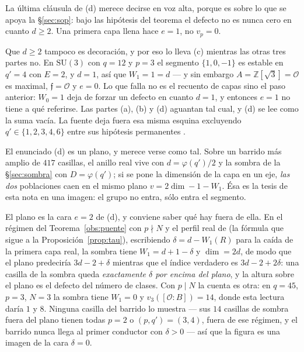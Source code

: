 \documentclass[11pt,a4paper]{article}
\theoremstyle{definition}
\newcommand{\SU}{\mathrm{SU}}
\newcommand{\ZZ}{\mathbb{Z}}
\newcommand{\cO}{\mathcal{O}}
\begin{document}
La \'ultima cl\'ausula de (d) merece decirse en voz alta, porque es sobre lo que se apoya la
\S\ref{sec:sop}: bajo las hip\'otesis del teorema el defecto no es nunca cero en cuanto $d\ge2$. Una
primera capa llena hace $e=1$, no $v_p=0$.

Que $d\ge2$ tampoco es decoraci\'on, y por eso lo lleva (c) mientras las otras tres partes no. En
$\SU(3)$ con $q=12$ y $p=3$ el segmento $\{1,0,-1\}$ es estable en $q'=4$ con $E=2$, y $d=1$, as\'i
que $W_1=1=d$ --- y sin embargo $A=\ZZ[\sqrt3]=\cO$ es maximal, $\mathfrak f=\cO$ y $e=0$. Lo que
falla no es el recuento de capas sino el paso anterior: $W_0=1$ deja de forzar un defecto en cuanto
$d=1$, y entonces $e=1$ no tiene a qu\'e referirse. Las partes (a), (b) y (d) aguantan tal cual, y
(d) se lee como la suma vac\'ia. La fuente deja fuera esa misma esquina excluyendo
$q'\in\{1,2,3,4,6\}$ entre sus hip\'otesis permanentes \cite[\S5]{Cond}.

El enunciado (d) es un plano, y merece verse como tal. Sobre un barrido m\'as amplio de $417$
casillas, el anillo real vive con $d=\varphi(q')/2$ y la sombra de la \S\ref{sec:sombra} con
$D=\varphi(q')$; si se pone la dimensi\'on de la capa en un eje, \emph{las dos} poblaciones caen en
el mismo plano $v=2\dim-1-W_1$. \'Esa es la tesis de esta nota en una imagen: el grupo no entra,
s\'olo entra el segmento.

El plano es la cara $e=2$ de (d), y conviene saber qu\'e hay fuera de ella. En el r\'egimen del
Teorema~\ref{obs:puente} con $p\nmid N$ y el perfil real de \cite{Cond} (la f\'ormula que sigue a la
Proposici\'on~\ref{prop:tau}), escribiendo $\delta=d-W_1(R)$ para la ca\'ida de la primera capa real,
la sombra tiene $W_1=d+1-\delta$ y $\dim=2d$, de modo que el plano
predecir\'ia $3d-2+\delta$ mientras que el \'indice verdadero es $3d-2+2\delta$: una casilla de la
sombra queda \emph{exactamente $\delta$ por encima del plano}, y la altura sobre el plano es el
defecto del n\'umero de clases. Con $p\mid N$ la cuenta es otra: en $q=45$, $p=3$, $N=3$ la sombra
tiene $W_1=0$ y $v_3([\cO:B])=14$, donde esta lectura dar\'ia $1$ y $8$. Ninguna casilla del barrido lo muestra --- sus $14$ casillas de
sombra fuera del plano tienen todas $p=2$ o $(p,q')=(3,4)$, fuera de ese r\'egimen, y el barrido
nunca llega al primer conductor con $\delta>0$ --- as\'i que la figura es una imagen de la cara
$\delta=0$.
\end{document}
